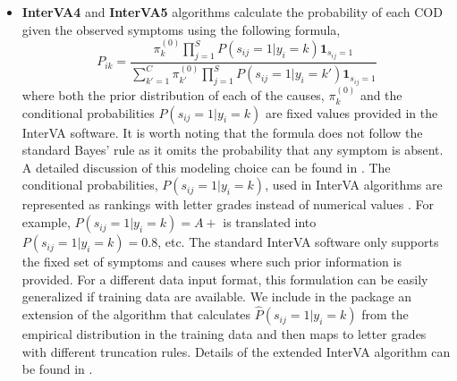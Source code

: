\begin{itemize}
\item
  \textbf{InterVA4} \citep{byass2012strengthening} and \textbf{InterVA5}
  \citep{byass2019integrated} algorithms calculate the probability of
  each COD given the observed symptoms using the following formula, \[
  P_{ik} = \frac{\pi_{k}^{(0)} \prod_{j=1}^S P(s_{ij}=1|y_{i}=k) \mathbf{1}_{s_{ij} = 1}}
  {\sum_{k' = 1}^C \pi_{k'}^{(0)} \prod_{j=1}^S P(s_{ij}=1|y_{i}=k') \mathbf{1}_{s_{ij} = 1}}
  \] where both the prior distribution of each of the causes,
  \(\pi_{k}^{(0)}\) and the conditional probabilities
  \(P(s_{ij} = 1 | y_i = k)\) are fixed values provided in the InterVA
  software. It is worth noting that the formula does not follow the
  standard Bayes' rule as it omits the probability that any symptom is
  absent. A detailed discussion of this modeling choice can be found in
  \citet{insilico}. The conditional probabilities,
  \(P(s_{ij}=1|y_{i}=k)\), used in InterVA algorithms are represented as
  rankings with letter grades instead of numerical values
  \citep{byass2012strengthening}. For example,
  \(P(s_{ij}=1|y_{i}=k) = A+\) is translated into
  \(P(s_{ij}=1|y_{i}=k) = 0.8\), etc. The standard InterVA software only
  supports the fixed set of symptoms and causes where such prior
  information is provided. For a different data input format, this
  formulation can be easily generalized if training data are available.
  We include in the  package an extension of the
  algorithm that calculates \(\hat P(s_{ij}=1|y_{i}=k)\) from the
  empirical distribution in the training data and then maps to letter
  grades with different truncation rules. Details of the extended
  InterVA algorithm can be found in \citet{insilico}.


\end{itemize}
